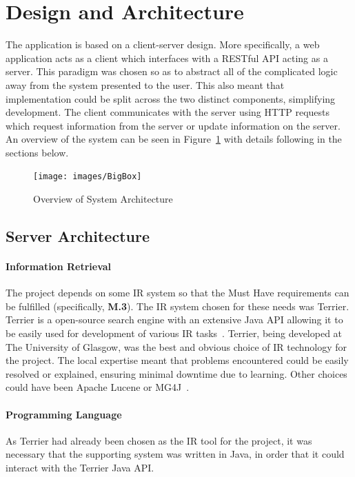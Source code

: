 \documentclass{l4proj}
\begin{document}
\section{Design and Architecture}
The application is based on a client-server design. More specifically, a web application acts as a client which interfaces with a RESTful API acting as a server. This paradigm was chosen so as to abstract all of the complicated logic away from the system presented to the user. This also meant that implementation could be split across the two distinct components, simplifying development.
The client communicates with the server using HTTP requests which request information from the server or update information on the server. An overview of the system can be seen in Figure~\ref{architecture} with details following in the sections below.
\begin{figure}[H]
\centering
\texttt{[image: images/BigBox]}
\caption{Overview of System Architecture}
\label{architecture}
\end{figure}

\subsection{Server Architecture}
\paragraph{Information Retrieval}
The project depends on some IR system so that the Must Have requirements can be fulfilled (specifically, \textbf{M.3}). The IR system chosen for these needs was Terrier. Terrier is a open-source search engine with an extensive Java API allowing it to be easily used for development of various IR tasks~\cite{terrier, macdonald2012puppy}.
Terrier, being developed at The University of Glasgow, was the best and obvious choice of IR technology for the project. The local expertise meant that problems encountered could be easily resolved or explained, ensuring minimal downtime due to learning.
Other choices could have been Apache Lucene or MG4J~\cite{middleton2007comparison}.
\paragraph{Programming Language}
As Terrier had already been chosen as the IR tool for the project, it was necessary that the supporting system was written in Java, in order that it could interact with the Terrier Java API.
\end{document}
